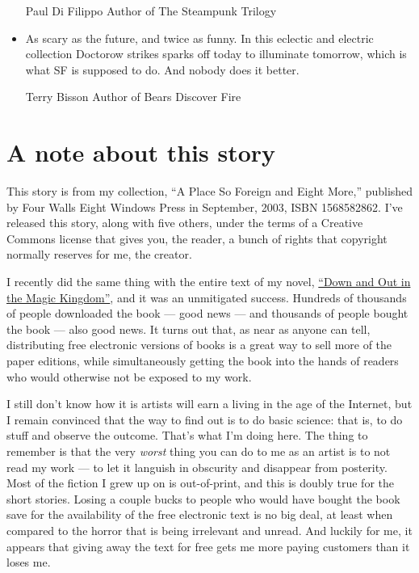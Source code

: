 \begin{itemize}
  \begin{authorof}
    Paul Di Filippo Author of The Steampunk Trilogy
  \end{authorof}
\item
  As scary as the future, and twice as funny. In this eclectic and
  electric collection Doctorow strikes sparks off today to illuminate
  tomorrow, which is what SF is supposed to do. And nobody does it
  better.

  \begin{authorof}
    Terry Bisson Author of Bears Discover Fire
  \end{authorof}
\end{itemize}


\section{A note about this story}

This story is from my collection,
``A Place So Foreign and Eight More,'' published by Four Walls
Eight Windows Press in September, 2003, ISBN 1568582862. I've
released this story, along with five others, under the terms of a
Creative Commons license that gives you, the reader, a bunch of
rights that copyright normally reserves for me, the creator.

I recently did the same thing with the entire text of my novel,
\href{http://craphound.com/down}{``Down and Out in the Magic Kingdom''},
and it was an unmitigated success. Hundreds of thousands of people
downloaded the book --- good news --- and thousands of people
bought the book --- also good news. It turns out that, as near as
anyone can tell, distributing free electronic versions of books is
a great way to sell more of the paper editions, while
simultaneously getting the book into the hands of readers who would
otherwise not be exposed to my work.

I still don't know how it is artists will earn a living in the age
of the Internet, but I remain convinced that the way to find out is
to do basic science: that is, to do stuff and observe the outcome.
That's what I'm doing here. The thing to remember is that the very
\emph{worst} thing you can do to me as an artist is to not read my
work --- to let it languish in obscurity and disappear from
posterity. Most of the fiction I grew up on is out-of-print, and
this is doubly true for the short stories. Losing a couple bucks to
people who would have bought the book save for the availability of
the free electronic text is no big deal, at least when compared to
the horror that is being irrelevant and unread. And luckily for me,
it appears that giving away the text for free gets me more paying
customers than it loses me.

